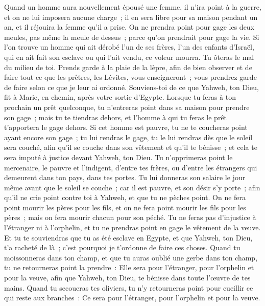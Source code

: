 \begin{multicols}{2}
Quand un homme aura nouvellement épousé une femme, il n'ira point à la guerre, et on ne lui imposera aucune charge~; il en sera libre pour sa maison pendant un an, et il réjouira la femme qu'il a prise.
On ne prendra point pour gage les deux meules, pas même la meule de dessus~; parce qu'on prendrait pour gage la vie.
Si l'on trouve un homme qui ait dérobé l'un de ses frères, l'un des enfants d'Israël, qui en ait fait son esclave ou qui l'ait vendu, ce voleur mourra. Tu ôteras le mal du milieu de toi.
Prends garde à la plaie de la lèpre, afin de bien observer et de faire tout ce que les prêtres, les Lévites, vous enseigneront~; vous prendrez garde de faire selon ce que je leur ai ordonné.
Souviens-toi de ce que Yahweh, ton Dieu, fit à Marie, en chemin, après votre sortie d'Egypte.
Lorsque tu feras à ton prochain un prêt quelconque, tu n'entreras point dans sa maison pour prendre son gage~;
mais tu te tiendras dehors, et l'homme à qui tu feras le prêt t'apportera le gage dehors.
Si cet homme est pauvre, tu ne te coucheras point ayant encore son gage~;
tu lui rendras le gage, tu le lui rendras dès que le soleil sera couché, afin qu'il se couche dans son vêtement et qu'il te bénisse~; et cela te sera imputé à justice devant Yahweh, ton Dieu.
Tu n'opprimeras point le mercenaire, le pauvre et l'indigent, d'entre tes frères, ou d'entre les étrangers qui demeurent dans ton pays, dans tes portes.
Tu lui donneras son salaire le jour même avant que le soleil se couche~; car il est pauvre, et son désir s'y porte~; afin qu'il ne crie point contre toi à Yahweh, et que tu ne pèches point.
On ne fera point mourir les pères pour les fils, et on ne fera point mourir les fils pour les pères~; mais on fera mourir chacun pour son péché.
Tu ne feras pas d'injustice à l'étranger ni à l'orphelin, et tu ne prendras point en gage le vêtement de la veuve.
Et tu te souviendras que tu as été esclave en Egypte, et que Yahweh, ton Dieu, t'a racheté de là~; c'est pourquoi je t'ordonne de faire ces choses.
Quand tu moissonneras dans ton champ, et que tu auras oublié une gerbe dans ton champ, tu ne retourneras point la prendre~: Elle sera pour l'étranger, pour l'orphelin et pour la veuve, afin que Yahweh, ton Dieu, te bénisse dans toute l'œuvre de tes mains.
Quand tu secoueras tes oliviers, tu n'y retourneras point pour cueillir ce qui reste aux branches~: Ce sera pour l'étranger, pour l'orphelin et pour la veuve.

\end{multicols}
